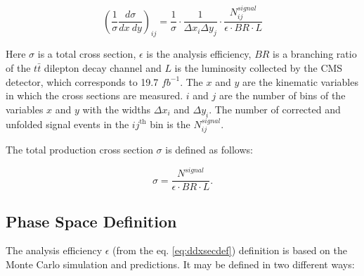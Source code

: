 \begin{equation}\label{eq:ddxsecdef}
 (\frac{1}{\sigma} \frac{d\sigma}{dx\:dy})_{ij} = \frac{1}{\sigma} \cdot \frac{1}{\Delta x_{i}\Delta y_{j}} \cdot \frac{N^{signal}_{ij}}{\epsilon \cdot BR \cdot L}
\end{equation}

Here $\sigma$ is a total cross section, $\epsilon$ is the analysis efficiency, $BR$ is a branching ratio of the $t\bar{t}$ dilepton decay channel and $L$ is the luminosity
collected by the CMS detector, which corresponds to 19.7 $fb^{-1}$. The $x$ and $y$ are the kinematic variables in which the cross sections 
are measured. $i$ and $j$ are the number of bins of the variables $x$ and $y$ with the widths $\Delta x_{i}$ and $\Delta y_{i}$.
The number of corrected and unfolded signal events in the $ij^{\textrm{th}}$ bin is the $N^{signal}_{ij}$.

The total production cross section $\sigma$ is defined as follows:

\begin{equation}
 \sigma = \frac{N^{signal}}{\epsilon \cdot BR \cdot L}.
\end{equation}

\subsection{Phase Space Definition}

The analysis efficiency $\epsilon$ (from the eq. \ref{eq:ddxsecdef}) definition is based on the Monte Carlo simulation and predictions.
It may be defined in two different ways:

